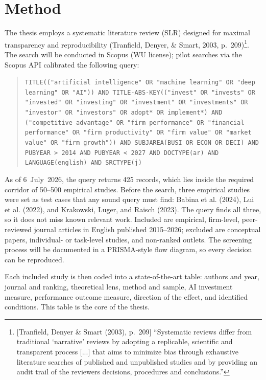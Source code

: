 \documentclass[12pt, a4paper]{article}
\begin{document}
\section{Method}

The thesis employs a systematic literature review (SLR) designed for maximal
transparency and reproducibility (Tranfield, Denyer, \& Smart, 2003,
p.~209)\footnote{[Tranfield, Denyer \& Smart (2003), p.~209] ``Systematic reviews differ from traditional `narrative' reviews by adopting a replicable, scientific and transparent process [...] that aims to minimize bias through exhaustive literature searches of published and unpublished studies and by providing an audit trail of the reviewers decisions, procedures and conclusions.''}.
The search will be conducted in Scopus (WU license); pilot searches via the
Scopus API calibrated the following query:

\begin{quote}\small\raggedright
\texttt{TITLE(("artificial intelligence" OR "machine learning" OR "deep
learning" OR "AI")) AND TITLE-ABS-KEY(("invest" OR "invests" OR "invested" OR
"investing" OR "investment" OR "investments" OR "investor" OR "investors" OR
adopt* OR implement*) AND ("competitive advantage" OR "firm performance" OR
"financial performance" OR "firm productivity" OR "firm value" OR "market
value" OR "firm growth")) AND SUBJAREA(BUSI OR ECON OR DECI) AND PUBYEAR > 2014
AND PUBYEAR < 2027 AND DOCTYPE(ar) AND LANGUAGE(english) AND SRCTYPE(j)}
\end{quote}

\noindent As of 6~July~2026, the query returns 425 records, which lies inside
the required corridor of 50--500 empirical studies. Before the search, three
empirical studies were set as test cases that any sound query must find:
Babina et al. (2024), Lui et al. (2022), and Krakowski, Luger, and Raisch
(2023). The query finds all three, so it does not miss known relevant work. Included are empirical, firm-level, peer-reviewed journal
articles in English published 2015--2026; excluded are conceptual papers,
individual- or task-level studies, and non-ranked outlets. The screening
process will be documented in a PRISMA-style flow diagram, so every decision
can be reproduced.

Each included study is then coded into a state-of-the-art table: authors and
year, journal and ranking, theoretical lens, method and sample, AI investment
measure, performance outcome measure, direction of the effect, and identified
conditions. This table is the core of the thesis.
\end{document}
